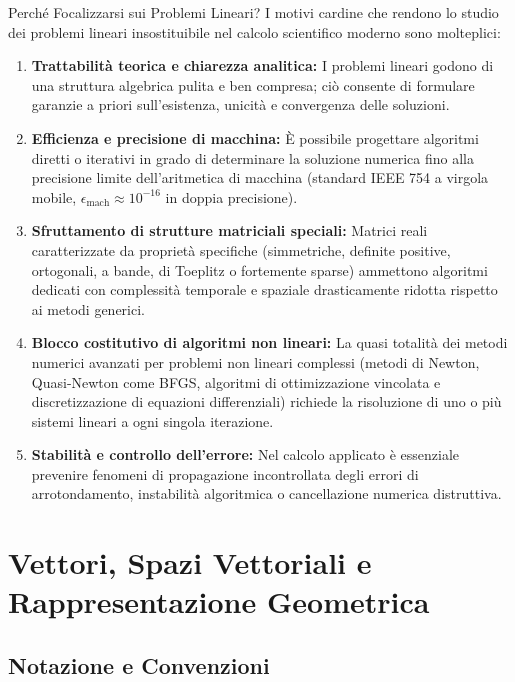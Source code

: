 \begin{noteblock}{Perché Focalizzarsi sui Problemi Lineari?}
I motivi cardine che rendono lo studio dei problemi lineari insostituibile nel calcolo scientifico moderno sono molteplici:
\begin{enumerate}
    \item \textbf{Trattabilità teorica e chiarezza analitica:} I problemi lineari godono di una struttura algebrica pulita e ben compresa; ciò consente di formulare garanzie a priori sull'esistenza, unicità e convergenza delle soluzioni.
    \item \textbf{Efficienza e precisione di macchina:} È possibile progettare algoritmi diretti o iterativi in grado di determinare la soluzione numerica fino alla precisione limite dell'aritmetica di macchina (standard IEEE 754 a virgola mobile, $\epsilon_{\text{mach}} \approx 10^{-16}$ in doppia precisione).
    \item \textbf{Sfruttamento di strutture matriciali speciali:} Matrici reali caratterizzate da proprietà specifiche (simmetriche, definite positive, ortogonali, a bande, di Toeplitz o fortemente sparse) ammettono algoritmi dedicati con complessità temporale e spaziale drasticamente ridotta rispetto ai metodi generici.
    \item \textbf{Blocco costitutivo di algoritmi non lineari:} La quasi totalità dei metodi numerici avanzati per problemi non lineari complessi (metodi di Newton, Quasi-Newton come BFGS, algoritmi di ottimizzazione vincolata e discretizzazione di equazioni differenziali) richiede la risoluzione di uno o più sistemi lineari a ogni singola iterazione.
    \item \textbf{Stabilità e controllo dell'errore:} Nel calcolo applicato è essenziale prevenire fenomeni di propagazione incontrollata degli errori di arrotondamento, instabilità algoritmica o cancellazione numerica distruttiva.
\end{enumerate}
\end{noteblock}

\FloatBarrier
\section{Vettori, Spazi Vettoriali e Rappresentazione Geometrica}

\subsection{Notazione e Convenzioni}

